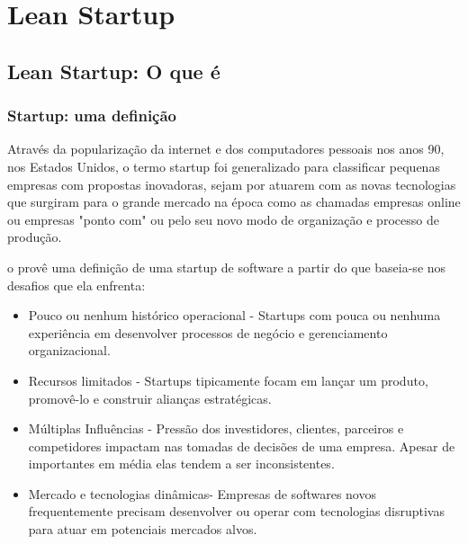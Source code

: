 \chapter{Lean Startup}
\label{cap:leanstartup}
\section{Lean Startup: O que é}
\subsection{Startup: uma definição}
\par Através da popularização da internet e dos computadores pessoais nos anos 90, nos Estados Unidos, o termo startup foi generalizado para classificar pequenas empresas com propostas inovadoras, sejam por atuarem com as novas tecnologias que surgiram para o grande mercado na época como as chamadas empresas online ou empresas "ponto com" ou  pelo seu novo modo de organização e processo de produção.
\par o \cite{nicolo:14} provê uma definição de uma startup de software a partir do \cite{sutton:00} que baseia-se nos desafios que ela enfrenta:
\begin{itemize}
\item Pouco ou nenhum histórico operacional - Startups com pouca ou nenhuma experiência em desenvolver processos de negócio e gerenciamento organizacional.
\item Recursos limitados - Startups tipicamente focam em lançar um produto, promovê-lo e construir alianças estratégicas.
\item Múltiplas Influências - Pressão dos investidores, clientes, parceiros e competidores impactam nas tomadas de decisões de uma empresa. Apesar de importantes em média elas tendem a ser inconsistentes.
\item Mercado e tecnologias dinâmicas- Empresas de softwares novos frequentemente precisam desenvolver ou operar com tecnologias disruptivas para atuar em potenciais mercados alvos.
\end{itemize}

